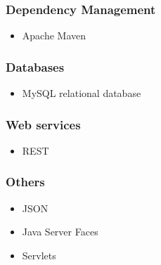 \documentclass[hidelinks, 12pt, oneside]{article}
\begin{document}
	\subsubsection{Dependency Management}
	\begin{itemize}
	\item Apache Maven
	\end{itemize}
	\subsubsection{Databases}
	\begin{itemize}
	\item MySQL relational database
	\end{itemize}
	\subsubsection{Web services}
	\begin{itemize}
	\item REST
	\end{itemize}
	\subsubsection{Others}
	\begin{itemize}
	\item JSON
	\item Java Server Faces
	\item Servlets
	\end{itemize}		
\end{document}
